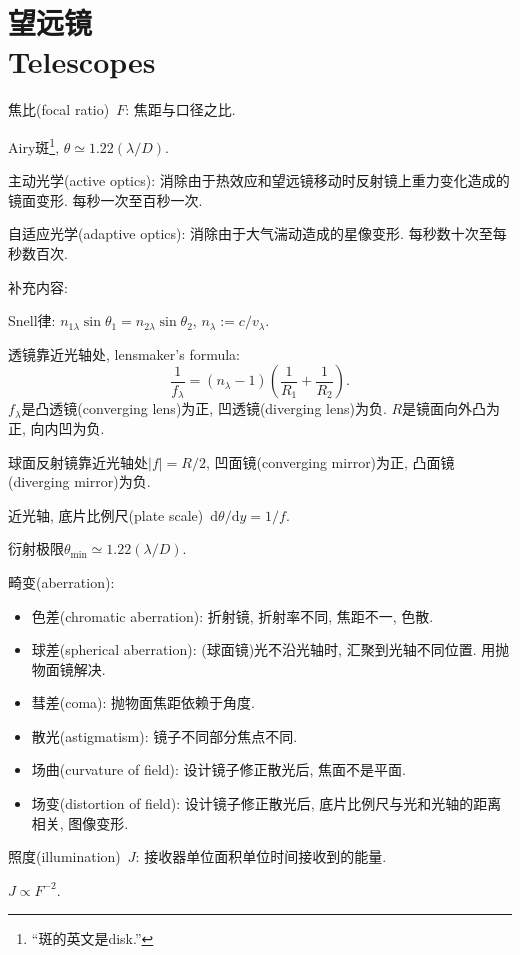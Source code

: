 \chapter{望远镜\\Telescopes}

焦比(focal ratio)~$F$: 焦距与口径之比.

Airy斑\footnote{``斑的英文是disk.''}, $\theta\simeq1.22(\lambda/D)$.

主动光学(active optics): 消除由于热效应和望远镜移动时反射镜上重力变化造成的镜面变形. 每秒一次至百秒一次.

自适应光学(adaptive optics): 消除由于大气湍动造成的星像变形. 每秒数十次至每秒数百次.

补充内容:

Snell律: $n_{1\lambda}\sin\theta_1=n_{2\lambda}\sin\theta_2$, $n_\lambda:=c/v_\lambda$.

透镜靠近光轴处, lensmaker's formula:
\begin{equation*}
    \frac{1}{f_\lambda}=(n_\lambda-1)\left(\frac{1}{R_1}+\frac{1}{R_2}\right).
\end{equation*}
$f_\lambda$是凸透镜(converging lens)为正, 凹透镜(diverging lens)为负. $R$是镜面向外凸为正, 向内凹为负.

球面反射镜靠近光轴处$\left\lvert f\right\rvert=R/2$, 凹面镜(converging mirror)为正, 凸面镜(diverging mirror)为负.

近光轴, 底片比例尺(plate scale)~$\mathrm{d}\theta/\mathrm{d}y=1/f$.

衍射极限$\theta_\text{min}\simeq1.22(\lambda/D)$.

畸变(aberration):
\begin{itemize}
    \item 色差(chromatic aberration): 折射镜, 折射率不同, 焦距不一, 色散.
    \item 球差(spherical aberration): (球面镜)光不沿光轴时, 汇聚到光轴不同位置. 用抛物面镜解决.
    \item 彗差(coma): 抛物面焦距依赖于角度.
    \item 散光(astigmatism): 镜子不同部分焦点不同.
    \item 场曲(curvature of field): 设计镜子修正散光后, 焦面不是平面.
    \item 场变(distortion of field): 设计镜子修正散光后, 底片比例尺与光和光轴的距离相关, 图像变形.
\end{itemize}

照度(illumination)~$J$: 接收器单位面积单位时间接收到的能量.

$J\propto F^{-2}$.

